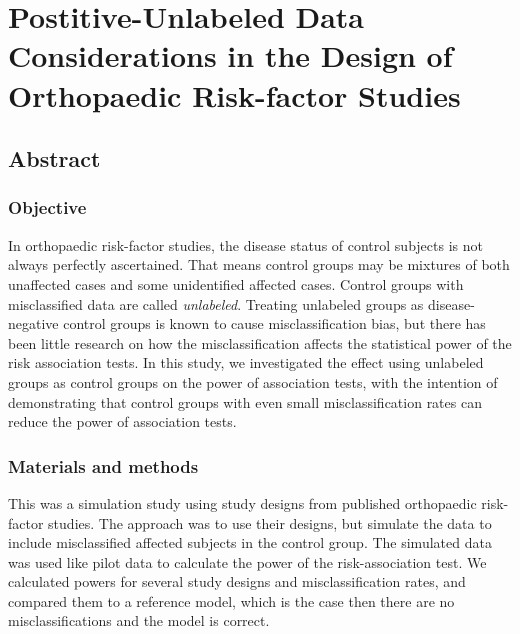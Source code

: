 \documentclass[
]{article}
\author{}
\date{\vspace{-2.5em}}
\begin{document}
\hypertarget{postitive-unlabeled-data-considerations-in-the-design-of-orthopaedic-risk-factor-studies}{%
\section{Postitive-Unlabeled Data Considerations in the Design of
Orthopaedic Risk-factor
Studies}\label{postitive-unlabeled-data-considerations-in-the-design-of-orthopaedic-risk-factor-studies}}

\hypertarget{abstract}{%
\subsection{Abstract}\label{abstract}}

\hypertarget{objective}{%
\subsubsection{Objective}\label{objective}}

In orthopaedic risk-factor studies, the disease status of control
subjects is not always perfectly ascertained. That means control groups
may be mixtures of both unaffected cases and some unidentified affected
cases. Control groups with misclassified data are called
\emph{unlabeled}. Treating unlabeled groups as disease-negative control
groups is known to cause misclassification bias, but there has been
little research on how the misclassification affects the statistical
power of the risk association tests. In this study, we investigated the
effect using unlabeled groups as control groups on the power of
association tests, with the intention of demonstrating that control
groups with even small misclassification rates can reduce the power of
association tests.

\hypertarget{materials-and-methods}{%
\subsubsection{Materials and methods}\label{materials-and-methods}}

This was a simulation study using study designs from published
orthopaedic risk-factor studies. The approach was to use their designs,
but simulate the data to include misclassified affected subjects in the
control group. The simulated data was used like pilot data to calculate
the power of the risk-association test. We calculated powers for several
study designs and misclassification rates, and compared them to a
reference model, which is the case then there are no misclassifications
and the model is correct.
\end{document}

